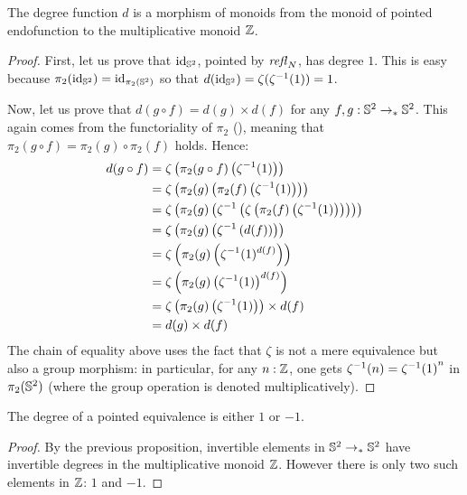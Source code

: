 \documentclass[english,a4]{article}
\newcommand{\ptdto}{\to_\ast}%
\begin{document}
\begin{proposition}
  The degree function $d$ is a morphism of monoids from the monoid of pointed
  endofunction to the multiplicative monoid $\mathbb{Z}$.
  \label{prop:deg-monoid-morphism}
\end{proposition}
\begin{proof}
  First, let us prove that $\mathord{\mathrm{id}}_{{\mathbb S^{2}}}$, pointed by $\mathop{{\mathit{refl}}_{N}}$, has degree $1$.
  This is easy because $\pi_2(\mathord{\mathrm{id}}_{{\mathbb S^{2}}}) = \mathord{\mathrm{id}}_{\pi_2({{\mathbb S^{2}}})}$ so that $d(\mathord{\mathrm{id}}_{{\mathbb S^{2}}})
  = \zeta({\zeta}^{-1}(1)) = 1$.

  Now, let us prove that $d(g\circ f) = d(g)\times d(f)$ for any $f,g:\Sp
  \ptdto\Sp$. This again comes from the functoriality of $\pi_2$
  (\cite[??]{HoTT}), meaning that $\pi_2(g\circ f) = \pi_2(g)\circ\pi_2(f)$
  holds. Hence:
  \begin{align*}
    d(g\circ f) &= \zeta\left( \pi_2(g\circ f)\left( {\zeta}^{-1}(1) \right) \right) 
    \\
    &= \zeta\left( \pi_2(g) \left( \pi_2(f)\left( {\zeta}^{-1}(1) \right)
    \right) \right) 
    \\
    &= \zeta\left( \pi_2(g) \left( {\zeta}^{-1} \left( \zeta \left( \pi_2(f)\left( {\zeta}^{-1}(1) \right)
    \right) \right) \right) \right)
    \\
    &= \zeta \left( \pi_2(g) \left( {\zeta}^{-1} \left(d(f)\right) \right) \right)
    \\
    &= \zeta \left( \pi_2(g) \left( {\zeta}^{-1}(1)^{d(f)} \right) \right)
    \\
    &= \zeta \left( \pi_2(g) \left( {\zeta}^{-1}(1)\right)^{d(f)} \right)
    \\
    &= \zeta \left( \pi_2(g) \left( {\zeta}^{-1}(1)\right) \right)\times d(f)
    \\
    &= d(g)\times d(f)
  \end{align*}
  The chain of equality above uses the fact that $\zeta$ is not a mere
  equivalence but also a group morphism: in particular, for any $n:\mathbb{Z}$, one
  gets ${\zeta}^{-1}(n) = {{\zeta}^{-1}(1)}^n$ in $\pi_2({{\mathbb S^{2}}})$ (where the group
  operation is denoted multiplicatively).
\end{proof}

\begin{corollary}
  The degree of a pointed equivalence is either $1$ or $-1$.
  \label{cor:degree-equivalences}
\end{corollary}
\begin{proof}
  By the previous proposition, invertible elements in $\Sp \ptdto \Sp$ have
  invertible degrees in the multiplicative monoid $\mathbb{Z}$. However there is only
  two such elements in $\mathbb{Z}$: $1$ and $-1$. 
\end{proof}
\end{document}
